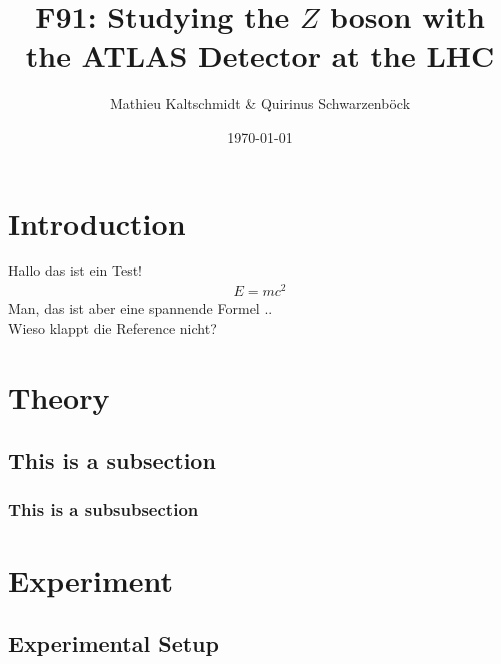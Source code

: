 \documentclass[twocolumn,
			   showpacs,%
               nofootinbib,
               aps,%
               eqsecnum,
               prd,
               notitlepage,
               showkeys,
               10pt]{revtex4-1}
\begin{document}
\title{F91: Studying the $Z$ boson with the ATLAS Detector at the LHC }
\author{Mathieu Kaltschmidt \& Quirinus Schwarzenb\"ock}
\date{\today}


\begin{abstract}
\blindtext
\end{abstract}

\maketitle



\section{Introduction}
Hallo das ist ein Test!
\begin{align}
	E = mc^2 
\end{align}
Man, das ist aber eine spannende Formel  .. \\
Wieso klappt die Reference nicht?

\blindtext



\section{Theory}

\blindtext

\subsection{This is a subsection}

\subsubsection{This is a subsubsection}





\section{Experiment}




\subsection{Experimental Setup}


\blindtext
\end{document}
